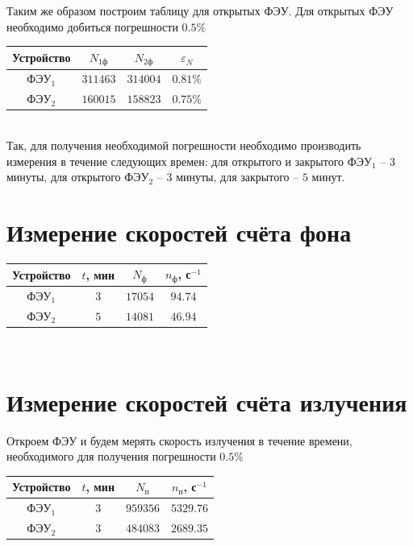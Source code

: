 \documentclass[12pt]{article}
\begin{document}
    Таким же образом построим таблицу для открытых ФЭУ. Для открытых ФЭУ
    необходимо добиться погрешности $0.5 \%$ \\

    \begin{tabular}{ || c || c | c | c ||}
      \hline
      Устройство & $N_{1ф}$ & $N_{2ф}$ & $\varepsilon_N$ \\ \hline
      ФЭУ$_1$ & $311463$ & $314004$ & $0.81 \%$ \\
      ФЭУ$_2$ & $160015$ & $158823$ & $0.75 \%$ \\
      \hline
    \end{tabular} \\

    Так, для получения необходимой погрешности необходимо производить измерения
    в течение следующих времен: для открытого и закрытого ФЭУ$_1$ -- $3$ минуты,
    для открытого ФЭУ$_2$ -- $3$ минуты, для закрытого -- $5$ минут.


  \section{Измерение скоростей счёта фона}

    \begin{tabular}{ || c || c | c | c ||}
      \hline
      Устройство & $t$, мин & $N_{ф}$ & $n_{ф}$, с$^{-1}$ \\ \hline
      ФЭУ$_1$ & $3$ & $17054$ & $94.74$ \\
      ФЭУ$_2$ & $5$ & $14081$ & $46.94$ \\
      \hline
    \end{tabular} \\


  \section{Измерение скоростей счёта излучения}

    Откроем ФЭУ и будем мерять скорость излучения в течение времени,
    необходимого для получения погрешности $0.5 \%$ \\

    \begin{tabular}{ || c || c | c | c ||}
      \hline
      Устройство & $t$, мин & $N_{п}$ & $n_{п}$, с$^{-1}$ \\ \hline
      ФЭУ$_1$ & $3$ & $959356$ & $5329.76$ \\
      ФЭУ$_2$ & $3$ & $484083$ & $2689.35$ \\
      \hline
    \end{tabular} \\
\end{document}
